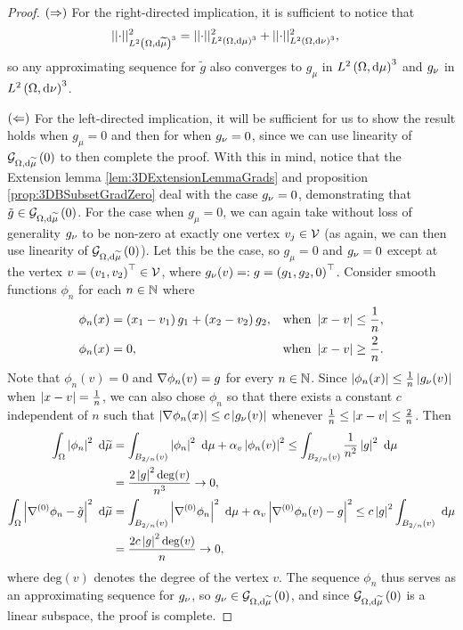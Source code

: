 \begin{proof}
	$\left( \Rightarrow \right)$ For the right-directed implication, it is sufficient to notice that
	\begin{align*}
		\lvert\lvert \cdot \rvert\rvert_{L^{2}\left( \Omega,\mathrm{d} \widetilde{\mu} \right)^3}^2 &= \lvert\lvert \cdot \rvert\rvert_{L^{2}\left( \Omega,\mathrm{d} \mu \right)^3}^2 + \lvert\lvert \cdot \rvert\rvert_{L^{2}\left( \Omega,\mathrm{d} \nu \right)^3}^2,
	\end{align*}
	so any approximating sequence for $\tilde{g}$ also converges to $g_\mu$ in $L^{2}\left( \Omega,\mathrm{d} \mu \right)^3$ and $g_\nu$ in $L^{2}\left( \Omega,\mathrm{d} \nu \right)^3$.
	
	$\left( \Leftarrow \right)$ For the left-directed implication, it will be sufficient for us to show the result holds when $g_\mu=0$ and then for when $g_\nu=0$, since we can use linearity of $\mathcal{G}_{ \Omega, \mathrm{d}\widetilde{\mu}}\left( 0 \right)$ to then complete the proof.
	With this in mind, notice that the Extension lemma \ref{lem:3DExtensionLemmaGrads} and proposition \ref{prop:3DBSubsetGradZero} deal with the case $g_\nu=0$, demonstrating that $\tilde{g}\in\mathcal{G}_{ \Omega, \mathrm{d}\widetilde{\mu}}\left( 0 \right)$.
	For the case when $g_\mu=0$, we can again take without loss of generality $g_\nu$ to be non-zero at exactly one vertex $v_j\in\mathcal{V}$ (as again, we can then use linearity of $\mathcal{G}_{ \Omega, \mathrm{d}\widetilde{\mu}}\left( 0 \right)$).
	Let this be the case, so $g_\mu=0$ and $g_\nu=0$ except at the vertex $v=\left( v_1,v_2 \right)^\top\in\mathcal{V}$, where $g_\nu(v) =: g = \left( g_1,g_2,0 \right)^\top$.
	Consider smooth functions $\phi_n$ for each $n\in\mathbb{N}$ where
	\begin{align*}
		\phi_n(x) &= \left( x_1-v_1 \right)g_1 + \left( x_2-v_2 \right)g_2, &\text{when } \left\lvert x-v \right\rvert\leq\frac{1}{n}, \\
		\phi_n(x) &= 0, &\text{when } \left\lvert x-v \right\rvert\geq\frac{2}{n}.
	\end{align*}
	Note that $\phi_n(v)=0$ and $\nabla\phi_n(v)=g$ for every $n\in\mathbb{N}$.
	Since $\left\lvert \phi_n(x) \right\rvert\leq\frac{1}{n}\left\lvert g_\nu(v) \right\rvert$ when $\left\lvert x-v \right\rvert=\frac{1}{n}$, we can also chose $\phi_n$ so that there exists a constant $c$ independent of $n$ such that $\left\lvert \nabla\phi_n(x) \right\rvert\leq c\left\lvert g_\nu(v) \right\rvert$ whenever $\frac{1}{n}\leq\left\lvert x-v \right\rvert\leq\frac{2}{n}$.
	Then
	\begin{align*}
		\int_{\Omega} \left\lvert \phi_n \right\rvert^2  \ \mathrm{d}\widetilde{\mu}
		&= \int_{B_{2/n}(v)} \left\lvert \phi_n \right\rvert^2  \ \mathrm{d}\mu + \alpha_v\left\lvert \phi_n(v) \right\rvert^2
		\leq \int_{B_{2/n}(v)} \frac{1}{n^2}\left\lvert g \right\rvert^2  \ \mathrm{d}\mu \\
		&= \frac{2\left\lvert g \right\rvert^2 \mathrm{deg}(v)}{n^3} \rightarrow 0, \\
		\int_{\Omega} \left\lvert \nabla^{(0)}\phi_n - \tilde{g} \right\rvert^2  \ \mathrm{d}\widetilde{\mu}
		&= \int_{B_{2/n}(v)} \left\lvert \nabla^{(0)}\phi_n \right\rvert^2  \ \mathrm{d}\mu + \alpha_v\left\lvert \nabla^{(0)}\phi_n(v) - g \right\rvert^2
		\leq c\left\lvert g \right\rvert^2\int_{B_{2/n}(v)} \ \mathrm{d}\mu \\
		&= \frac{2c\left\lvert g \right\rvert^2\mathrm{deg}(v)}{n} \rightarrow 0,
	\end{align*}
	where $\mathrm{deg}(v)$ denotes the degree of the vertex $v$.
	The sequence $\phi_n$ thus serves as an approximating sequence for $g_\nu$, so $g_\nu\in\mathcal{G}_{ \Omega, \mathrm{d}\widetilde{\mu}}\left( 0 \right)$, and since $\mathcal{G}_{ \Omega, \mathrm{d}\widetilde{\mu}}\left( 0 \right)$ is a linear subspace, the proof is complete.
\end{proof}

